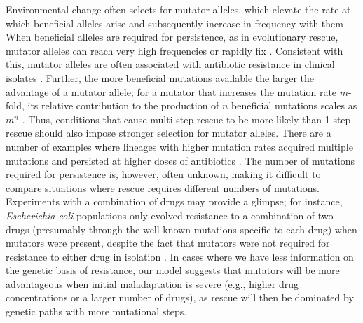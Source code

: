 \documentclass[9pt,twocolumn,twoside,lineno]{gsajnl}
\begin{document}
Environmental change often selects for mutator alleles, which elevate the rate at which beneficial alleles arise and subsequently increase in frequency with them \citep{tenaillon2001second}.
When beneficial alleles are required for persistence, as in evolutionary rescue, mutator alleles can reach very high frequencies or rapidly fix \citep[e.g.,][]{mao1997proliferation}.
Consistent with this, mutator alleles are often associated with antibiotic resistance in clinical isolates \citep[see examples in][]{Bell2017}.
Further, the more beneficial mutations available the larger the advantage of a mutator allele; for a mutator that increases the mutation rate $m$-fold, its relative contribution to the production of $n$ beneficial mutations scales as $m^n$ \citep{tenaillon1999mutators}.
Thus, conditions that cause multi-step rescue to be more likely than 1-step rescue should also impose stronger selection for mutator alleles.
There are a number of examples where lineages with higher mutation rates acquired multiple mutations and persisted at higher doses of antibiotics \citep{couce2015bypass,san2017multicopy}.
The number of mutations required for persistence is, however, often unknown, making it difficult to compare situations where rescue requires different numbers of mutations.
Experiments with a combination of drugs may provide a glimpse; for instance, \textit{Escherichia coli} populations only evolved resistance to a combination of two drugs (presumably through the well-known mutations specific to each drug) when mutators were present, despite the fact that mutators were not required for resistance to either drug in isolation \citep{gifford2019mutators}. 
In cases where we have less information on the genetic basis of resistance, our model suggests that mutators will be more advantageous when initial maladaptation is severe (e.g., higher drug concentrations or a larger number of drugs), as rescue will then be dominated by genetic paths with more mutational steps.
\end{document}
